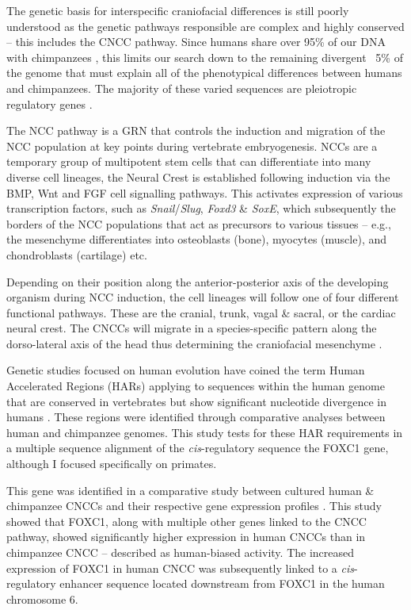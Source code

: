 \documentclass{article}[12pt]
\begin{document}
The genetic basis for interspecific craniofacial differences is still poorly understood as the genetic pathways responsible are complex and highly conserved – this includes the \Gls{CNCC} pathway. Since humans share over 95\% of our DNA with chimpanzees \parencite{Suntsova2020}, this limits our search down to the remaining divergent ~5\% of the genome that must explain all of the phenotypical differences between humans and chimpanzees. The majority of these varied sequences are pleiotropic regulatory genes \parencite{Franchini2017}.

The \Gls{NCC} pathway is a \Gls{GRN} that controls the induction and migration of the NCC population at key points during vertebrate embryogenesis. NCCs are a temporary group of multipotent stem cells that can differentiate into many diverse cell lineages, the Neural Crest is established following induction via the BMP, Wnt and FGF cell signalling pathways. This activates expression of various transcription factors, such as \emph{Snail}/\emph{Slug}, \emph{Foxd3} \& \emph{SoxE}, which subsequently the borders of the NCC populations that act as precursors to various tissues – e.g., the mesenchyme differentiates into osteoblasts (bone), myocytes (muscle), and chondroblasts (cartilage) etc. \parencite{Huang2004, Kulesa2010}

Depending on their position along the anterior-posterior axis of the developing organism during NCC induction, the cell lineages will follow one of four different functional pathways. These are the cranial, trunk, vagal \& sacral, or the cardiac neural crest. The CNCCs will migrate in a species-specific pattern along the dorso-lateral axis of the head thus determining the craniofacial mesenchyme \parencite{Kulesa2010}.

Genetic studies focused on human evolution have coined the term Human Accelerated Regions (HARs) applying to sequences within the human genome that are conserved in vertebrates but show significant nucleotide divergence in humans \parencite{Gittelman2015}. These regions were identified through comparative analyses between human and chimpanzee genomes. This study tests for these \Gls{HAR} requirements in a multiple sequence alignment of the \emph{cis}-regulatory sequence the FOXC1 gene, although I focused specifically on primates.

This gene was identified in a comparative study between cultured human \& chimpanzee CNCCs and their respective gene expression profiles \parencite{Prescott2015}. This study showed that FOXC1, along with multiple other genes linked to the CNCC pathway, showed significantly higher expression in human CNCCs than in chimpanzee CNCC – described as human-biased activity. The increased expression of FOXC1 in human CNCC was subsequently linked to a \emph{cis}-regulatory enhancer sequence located downstream from FOXC1 in the human chromosome 6.
\end{document}
